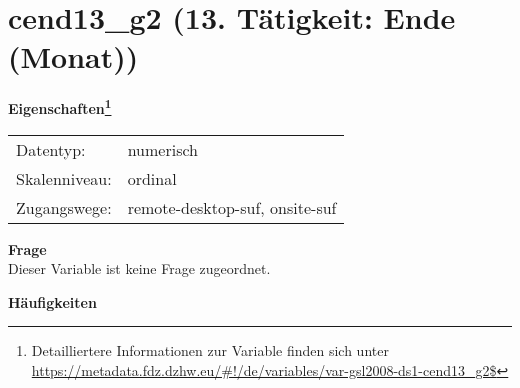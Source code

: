 
    \setcounter{footnote}{0}

    \vspace*{-1.8cm}
	\section{cend13\_g2 (13. Tätigkeit: Ende (Monat))}
	\label{section:cend13_g2}



    \vspace*{0.5cm}
    \noindent\textbf{Eigenschaften\footnote{Detailliertere Informationen zur Variable finden sich unter
		\url{https://metadata.fdz.dzhw.eu/\#!/de/variables/var-gsl2008-ds1-cend13_g2$}}}\\
	\begin{tabularx}{\hsize}{@{}lX}
	Datentyp: & numerisch \\
	Skalenniveau: & ordinal \\
	Zugangswege: &
	  remote-desktop-suf, 
	  onsite-suf
 \\
    \end{tabularx}



		\vspace*{0.5cm}
		\noindent\textbf{Frage}\\
		Dieser Variable ist keine Frage zugeordnet.





        		\vspace*{0.5cm}
                \noindent\textbf{Häufigkeiten}

